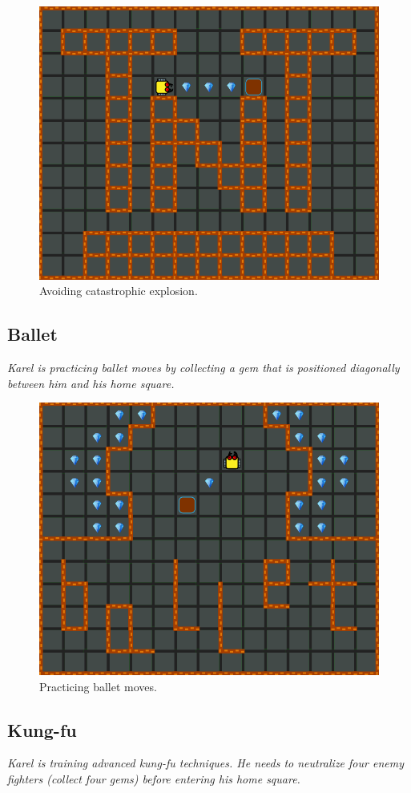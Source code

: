\begin{figure}[!ht]
\begin{center}
\includegraphics[height=0.4\textwidth]{img/b02.png}
\end{center}
\vspace{-4mm}
\caption{Avoiding catastrophic explosion.}
\label{fig:b02}
\vspace{-1.2cm}
\end{figure}
\newpage


\subsection{Ballet}

{\em Karel is practicing ballet moves by collecting a gem that is positioned diagonally between him and his home square.}

\begin{figure}[!ht]
\begin{center}
\includegraphics[height=0.4\textwidth]{img/b03.png}
\end{center}
\vspace{-4mm}
\caption{Practicing ballet moves.}
\label{fig:b03}
\vspace{-1cm}
\end{figure}

\subsection{Kung-fu}
{\em Karel is training advanced kung-fu techniques. He needs to neutralize four enemy fighters (collect four gems) before entering his home square.}

